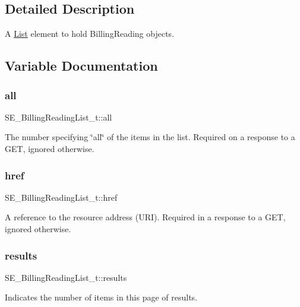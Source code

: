 \subsection{Detailed Description}
A \hyperlink{structList}{List} element to hold Billing\+Reading objects. 

\subsection{Variable Documentation}
\mbox{\label{group__BillingReadingList_ga1dcc0d443c7bbbb96df9bf7af537ce2a}} 
\subsubsection{\texorpdfstring{all}{all}}
{\footnotesize\ttfamily S\+E\+\_\+\+Billing\+Reading\+List\+\_\+t\+::all}

The number specifying \char`\"{}all\char`\"{} of the items in the list. Required on a response to a G\+ET, ignored otherwise. \mbox{\label{group__BillingReadingList_gaebc6ad48b2507e612e497bea80757f34}} 
\subsubsection{\texorpdfstring{href}{href}}
{\footnotesize\ttfamily S\+E\+\_\+\+Billing\+Reading\+List\+\_\+t\+::href}

A reference to the resource address (U\+RI). Required in a response to a G\+ET, ignored otherwise. \mbox{\label{group__BillingReadingList_gad0f564641791feb12946e5bc2f729f1b}} 
\subsubsection{\texorpdfstring{results}{results}}
{\footnotesize\ttfamily S\+E\+\_\+\+Billing\+Reading\+List\+\_\+t\+::results}

Indicates the number of items in this page of results. 